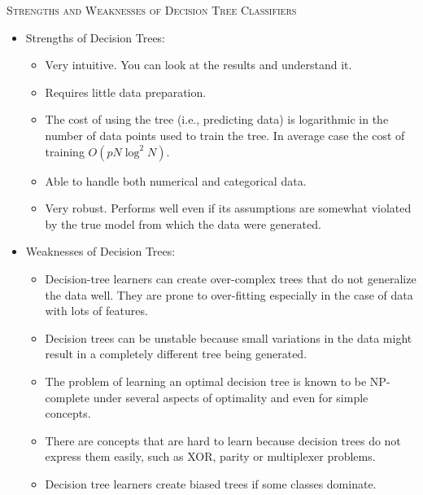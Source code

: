 \documentclass[twoside,openright,titlepage,numbers=noenddot,headinclude,%
               footinclude=true,cleardoublepage=empty,abstractoff,BCOR=5mm,%
               paper=a4,fontsize=11pt,ngerman,american]{scrreprt}
\numberwithin{theorem}{chapter}
\numberwithin{definition}{chapter}
\numberwithin{algorithm}{chapter}
\numberwithin{figure}{chapter}
\numberwithin{table}{chapter}
\numberwithin{equation}{chapter}
\newenvironment{remark}[1]{%
  \definecolor{shadecolor}{gray}{0.9}%
  \begin{shaded}{\color{Maroon}\noindent\textsc{#1}}\\%
}{%
  \end{shaded}%
}
\begin{document}
\begin{itemize}
\begin{remark}{Strengths and Weaknesses of Decision Tree Classifiers}
       \begin{itemize}
       \item Strengths of Decision Trees:
              \begin{itemize} 
                     \item Very intuitive. You can look at the results and understand it. 
                     \item Requires little data preparation. 
                     \item The cost of using the tree (i.e., predicting data) is logarithmic in the number of data points used to train the tree. In average case the cost of training $ O(pN\log^2 N)$.
                     \item Able to handle both numerical and categorical data.
                     \item Very robust. Performs well even if its assumptions are somewhat violated by the true model from which the data were generated.
              \end{itemize}
       \item Weaknesses of Decision Trees:
              \begin{itemize} 
                     \item Decision-tree learners can create over-complex trees that do not generalize the data well. They are prone to over-fitting especially in the case of data with lots of features.
                     \item Decision trees can be unstable because small variations in the data might result in a completely different tree being generated. 
                     \item The problem of learning an optimal decision tree is known to be NP-complete under several aspects of optimality and even for simple concepts. 
                     \item There are concepts that are hard to learn because decision trees do not express them easily, such as XOR, parity or multiplexer problems.
                     \item Decision tree learners create biased trees if some classes dominate. 
              \end{itemize}
       \end{itemize}
\end{remark}



\end{itemize}
\end{document}
